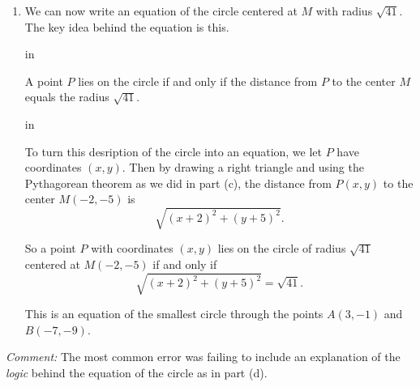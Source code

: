 \documentclass{ximera}
\newcommand{\pskip}{\vskip 0.1 in}
\begin{document}
\begin{question}
\begin{explanation}
\begin{enumerate}
\item We can now write an equation of the circle centered at $M$ with radius $\sqrt{41}$. The key idea behind the equation is this.
 
\pskip

A point $P$ lies on the circle if and only if the distance from $P$ to the center $M$ equals the radius $\sqrt{41}$. 

\pskip

To turn this desription of the circle into an equation, we let $P$ have coordinates $(x,y)$. Then by drawing a right triangle and using the Pythagorean theorem as we did in part (c), the distance from $P(x,y)$ to the center $M(-2,-5)$ is
\[
      \sqrt{(x+2)^2 + (y+5)^2}.
\]

So a point $P$ with coordinates $(x,y)$ lies on the circle of radius $\sqrt{41}$ centered at $M(-2,-5)$ if and only if
\[
  \sqrt{(x+2)^2 + (y+5)^2} = \sqrt{41}.
\]

This is an equation of the smallest circle through the points $A(3,-1)$ and $B(-7,-9)$.

\end{enumerate}

\emph{Comment:} The most common error was failing to include an explanation of the \emph{logic} behind the equation of the circle as in part (d).
\end{explanation}
\end{question}
\end{document}
